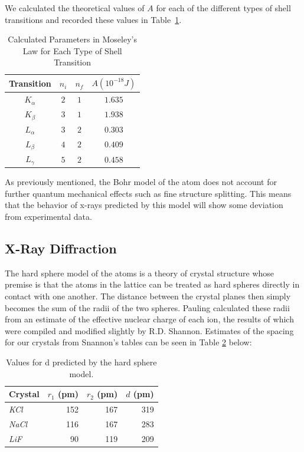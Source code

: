 \documentclass[%
 reprint,
 amsmath,amssymb,
 aps,
 pra,
]{revtex4-1}
\begin{document}
We calculated the theoretical values of $A$ for each of the different types of shell transitions and recorded these values in Table~\ref{Tab:RydParam}.

\begin{table}[htbp]
	\begin{center}
		\begin{tabular}{|c|c|c|c|}
			\hline Transition & $n_{i}$  & $n_{f}$ & $A (10^{-18} J)$ \\
			\hline $K_{\alpha}$ & $2$ & $1$ & $1.635$ \\
			\hline $K_{\beta}$ & $3$ & $1$ & $1.938$ \\
			\hline $L_{\alpha}$ & $3$ & $2$ & $0.303$ \\
			\hline $L_{\beta}$ & $4$ & $2$ & $0.409$ \\
			\hline $L_{\gamma}$ & $5$ & $2$ & $0.458$ \\
			\hline
		\end{tabular}
	\end{center}
	\caption{Calculated Parameters in Moseley's Law for Each Type of Shell Transition}
	\label{Tab:RydParam}
\end{table}

As previously mentioned, the Bohr model of the atom does not account for further quantum mechanical effects such as fine structure splitting. This means that the behavior of x-rays predicted by this model will show some deviation from experimental data.

\subsection{X-Ray Diffraction}

The hard sphere model of the atoms is a theory of crystal structure whose premise is that the atoms in the lattice can be treated as hard spheres directly in contact with one another. The distance between the crystal planes then simply becomes the sum of the radii of the two spheres. Pauling calculated these radii from an estimate of the effective nuclear charge of each ion\cite{hard_sphere2}, the results of which were compiled and modified slightly by R.D. Shannon\cite{hard_sphere}. Estimates of the spacing for our crystals from Snannon's tables can be seen in Table \ref{table:hardsphere_d} below:

\begin{table}[htbp]
	\begin{center}
	\begin{tabular}{|l|r|r|r|}
		\hline
		\textbf{Crystal} & \multicolumn{1}{l|}{\textbf{$r_1$ (pm)}} & \multicolumn{1}{l|}{\textbf{$r_2$ (pm)}} & \multicolumn{1}{l|}{\textbf{$d$ (pm)}} \\ \hline
		\textit{KCl } & 152 & 167 & 319 \\ \hline
		\textit{NaCl} & 116 & 167 & 283 \\ \hline
		\textit{LiF} & 90 & 119 & 209 \\ \hline
	\end{tabular}
	\end{center}
	\caption{Values for d predicted by the hard sphere model\cite{hard_sphere}.}
	\label{table:hardsphere_d}
\end{table}
\end{document}
